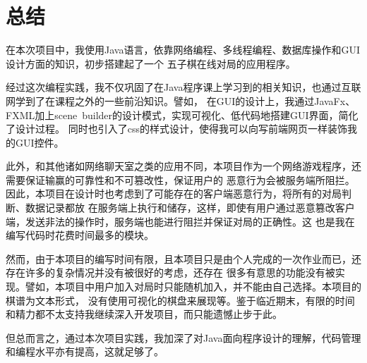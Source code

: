 \documentclass[utf8]{article}
\begin{document}
\section{总结}
在本次项目中，我使用Java语言，依靠网络编程、多线程编程、数据库操作和GUI设计方面的知识，初步搭建起了一个
五子棋在线对局的应用程序。

经过这次编程实践，我不仅巩固了在Java程序课上学习到的相关知识，也通过互联网学到了在课程之外的一些前沿知识。譬如，
在GUI的设计上，我通过JavaFx、FXML加上scene\ builder的设计模式，实现可视化、低代码地搭建GUI界面，简化了设计过程。
同时也引入了css的样式设计，使得我可以向写前端网页一样装饰我的GUI控件。

此外，和其他诸如网络聊天室之类的应用不同，本项目作为一个网络游戏程序，还需要保证输赢的可靠性和不可篡改性，保证用户的
恶意行为会被服务端所阻拦。因此，本项目在设计时也考虑到了可能存在的客户端恶意行为，将所有的对局判断、数据记录都放
在服务端上执行和储存，这样，即使有用户通过恶意篡改客户端，发送非法的操作时，服务端也能进行阻拦并保证对局的正确性。这
也是我在编写代码时花费时间最多的模块。

然而，由于本项目的编写时间有限，且本项目只是由个人完成的一次作业而已，还存在许多的复杂情况并没有被很好的考虑，还存在
很多有意思的功能没有被实现。譬如，本项目中用户加入对局时只能随机加入，并不能由自己选择。本项目的棋谱为文本形式，
没有使用可视化的棋盘来展现等。鉴于临近期末，有限的时间和精力都不太支持我继续深入开发项目，而只能遗憾止步于此。

但总而言之，通过本次项目实践，我加深了对Java面向程序设计的理解，代码管理和编程水平亦有提高，这就足够了。
\end{document}
